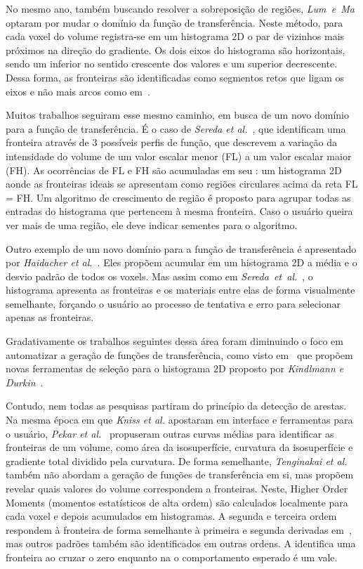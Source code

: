 	No mesmo ano, também buscando resolver a sobreposição de regiões, \textit{Lum~e~Ma}~\cite{lumema} optaram por mudar o domínio da função de transferência. Neste método, para cada voxel do volume registra-se em um histograma 2D o par de vizinhos mais próximos na direção do gradiente. Os dois eixos do histograma são horizontais, sendo um inferior no sentido crescente dos valores e um superior decrescente. Dessa forma, as fronteiras são identificadas como segmentos retos que ligam os eixos e não mais arcos como em~\cite{gordon}.
	
	Muitos trabalhos seguiram esse mesmo caminho, em busca de um novo domínio para a função de transferência. É o caso de \textit{Sereda et al.}~\cite{sereda1}, que identificam uma fronteira através de 3 possíveis perfis de função, que descrevem a variação da intensidade do volume de um valor escalar menor (FL) a um valor escalar maior (FH). As ocorrências de FL e FH são acumuladas em seu : um histograma 2D aonde as fronteiras ideais se apresentam como regiões circulares acima da reta FL = FH. Um algoritmo de crescimento de região é proposto para agrupar todas as entradas do histograma que pertencem à mesma fronteira. Caso o usuário queira ver mais de uma região, ele deve indicar sementes para o algoritmo.
	
	Outro exemplo de um novo domínio para a função de transferência é apresentado por \textit{Haidacher et al.}~\cite{haidacher}. Eles propõem acumular em um histograma 2D a média e o desvio padrão de todos os voxels. Mas assim como em \textit{Sereda~et~al.}~\cite{sereda1}, o histograma apresenta as fronteiras e os materiais entre elas de forma visualmente semelhante, forçando o usuário ao processo de tentativa e erro para selecionar apenas as fronteiras.
	
	Gradativamente os trabalhos seguintes dessa área foram diminuindo o foco em automatizar a geração de funções de transferência, como visto em~\cite{zou, wang} que propõem novas ferramentas de seleção para o histograma 2D proposto por \textit{Kindlmann e Durkin}~\cite{gordon}.
	
	Contudo, nem todas as pesquisas partiram do princípio da detecção de arestas. Na mesma época em que \textit{Kniss et al.} apostaram em interface e ferramentas para o usuário, \textit{Pekar et al.}~\cite{pekar} propuseram outras curvas médias para identificar as fronteiras de um volume, como área da isosuperfície, curvatura da isosuperfície e gradiente total dividido pela curvatura. De forma semelhante, \textit{Tenginakai et al.}~\cite{salient} também não abordam a geração de funções de transferência em si, mas propõem revelar quais valores do volume correspondem a fronteiras. Neste, Higher Order Moments (momentos estatísticos de alta ordem) são calculados localmente para cada voxel e depois acumulados em histogramas. A segunda e terceira ordem respondem à fronteira de forma semelhante à primeira e segunda derivadas em~\cite{gordon}, mas outros padrões também são identificados em outras ordens. A  identifica uma fronteira ao cruzar o zero enquanto na  o comportamento esperado é um vale.
	
